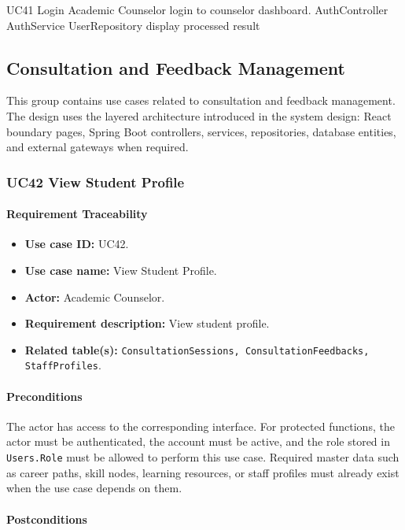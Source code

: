 \SequenceDiagram
{UC41 Login}
{Academic Counselor}
{login to counselor dashboard.}
{AuthController}
{AuthService}
{UserRepository}
{display processed result}

\subsection{Consultation and Feedback Management}

This group contains use cases related to consultation and feedback management. The design uses the layered architecture introduced in the system design: React boundary pages, Spring Boot controllers, services, repositories, database entities, and external gateways when required.

\subsubsection{UC42 View Student Profile}

\paragraph{Requirement Traceability}

\begin{itemize}
    \item \textbf{Use case ID:} UC42.
    \item \textbf{Use case name:} View Student Profile.
    \item \textbf{Actor:} Academic Counselor.
    \item \textbf{Requirement description:} View student profile.
    \item \textbf{Related table(s):} \texttt{ConsultationSessions, ConsultationFeedbacks, StaffProfiles}.
\end{itemize}

\paragraph{Preconditions}

The actor has access to the corresponding interface. For protected functions, the actor must be authenticated, the account must be active, and the role stored in \texttt{Users.Role} must be allowed to perform this use case. Required master data such as career paths, skill nodes, learning resources, or staff profiles must already exist when the use case depends on them.

\paragraph{Postconditions}

